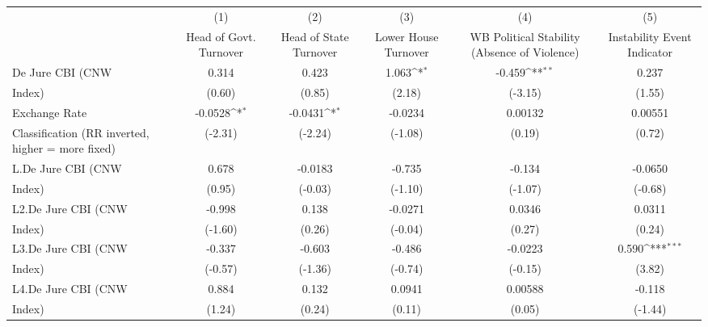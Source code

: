 {
\def\sym#1{\ifmmode^{#1}\else\(^{#1}\)\fi}
\begin{tabular}{l*{5}{c}}
\hline\hline
                    &\multicolumn{1}{c}{(1)}&\multicolumn{1}{c}{(2)}&\multicolumn{1}{c}{(3)}&\multicolumn{1}{c}{(4)}&\multicolumn{1}{c}{(5)}\\
                    &\multicolumn{1}{c}{Head of Govt. Turnover}&\multicolumn{1}{c}{Head of State Turnover}&\multicolumn{1}{c}{Lower House Turnover}&\multicolumn{1}{c}{WB Political Stability (Absence of Violence)}&\multicolumn{1}{c}{Instability Event Indicator}\\
\hline
De Jure CBI (CNW    &       0.314         &       0.423         &       1.063\sym{*}  &      -0.459\sym{**} &       0.237         \\
Index)              &      (0.60)         &      (0.85)         &      (2.18)         &     (-3.15)         &      (1.55)         \\
[1em]
Exchange Rate       &     -0.0528\sym{*}  &     -0.0431\sym{*}  &     -0.0234         &     0.00132         &     0.00551         \\
Classification (RR inverted, higher = more fixed)&     (-2.31)         &     (-2.24)         &     (-1.08)         &      (0.19)         &      (0.72)         \\
[1em]
L.De Jure CBI (CNW  &       0.678         &     -0.0183         &      -0.735         &      -0.134         &     -0.0650         \\
Index)              &      (0.95)         &     (-0.03)         &     (-1.10)         &     (-1.07)         &     (-0.68)         \\
[1em]
L2.De Jure CBI (CNW &      -0.998         &       0.138         &     -0.0271         &      0.0346         &      0.0311         \\
Index)              &     (-1.60)         &      (0.26)         &     (-0.04)         &      (0.27)         &      (0.24)         \\
[1em]
L3.De Jure CBI (CNW &      -0.337         &      -0.603         &      -0.486         &     -0.0223         &       0.590\sym{***}\\
Index)              &     (-0.57)         &     (-1.36)         &     (-0.74)         &     (-0.15)         &      (3.82)         \\
[1em]
L4.De Jure CBI (CNW &       0.884         &       0.132         &      0.0941         &     0.00588         &      -0.118         \\
Index)              &      (1.24)         &      (0.24)         &      (0.11)         &      (0.05)         &     (-1.44)         \\

\end{tabular}}
